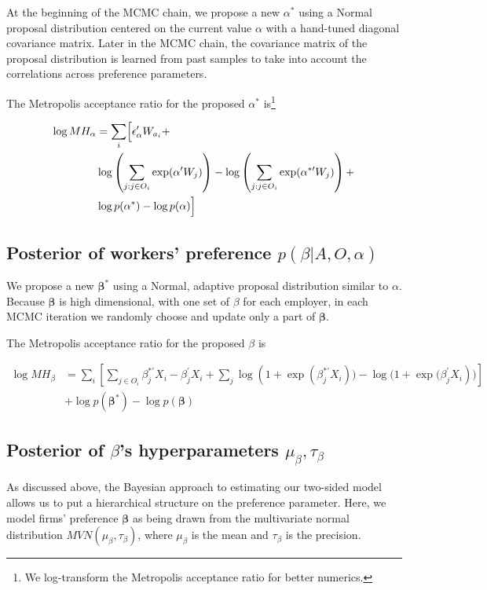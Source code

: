 At the beginning of the MCMC chain, we propose a new $\alpha^*$ using a Normal
proposal distribution centered on the current value $\alpha$ with a hand-tuned
diagonal covariance matrix. Later in the MCMC chain, the covariance matrix of
the proposal distribution is learned from past samples to take into account the
correlations across preference parameters.

The Metropolis acceptance ratio for the proposed $\alpha^*$ is\footnote{We
  log-transform the Metropolis acceptance ratio for better numerics.}

\begin{align}
\log MH_\alpha &= \sum_i \Bigl[ \epsilon_\alpha' W_{a_i} + \nonumber \\
  & \log\left(\sum\limits_{j:j \in O_i} \exp(\alpha' W_j)\right) -
  \log\left(\sum\limits_{j:j \in O_i} \exp(\alpha^{*\prime} W_j)\right) + \nonumber\\
  & \log p(\alpha^*) - \log p(\alpha) \Bigr]
\end{align}

\subsection{Posterior of workers' preference $p(\beta|A, O, \alpha)$}

We propose a new $\bm{\beta}^*$ using a Normal, adaptive proposal distribution
similar to $\alpha$. Because $\bm{\beta}$ is high dimensional, with one set of
$\beta$ for each employer, in each MCMC iteration we randomly choose and update
only a part of $\bm{\beta}$.

The Metropolis acceptance ratio for the proposed $\beta$ is

\begin{align}
  \log MH_\beta &= \sum_i \left[ \sum_{j \in O_i} \beta_j^{*\prime}X_i - \beta_j^{\prime}X_i + \sum_{j} \log(1 + {\exp({\beta_j^{*\prime}X_i})) - \log(1 +  \exp(\beta_j^{\prime}X_i})) \right] \nonumber \\
 & + \log p(\bm{\beta}^*) - \log p(\bm{\beta})
\end{align}


\subsection{Posterior of $\beta$'s hyperparameters $\mu_{\beta}, \tau_{\beta}$}

As discussed above, the Bayesian approach to estimating our two-sided model
allows us to put a hierarchical structure on the preference parameter. Here, we
model firms' preference $\bm{\beta}$ as being drawn from the multivariate normal
distribution $MVN(\mu_{\beta}, \tau_{\beta})$, where $\mu_{\beta}$ is the mean
and $\tau_{\beta}$ is the precision.

